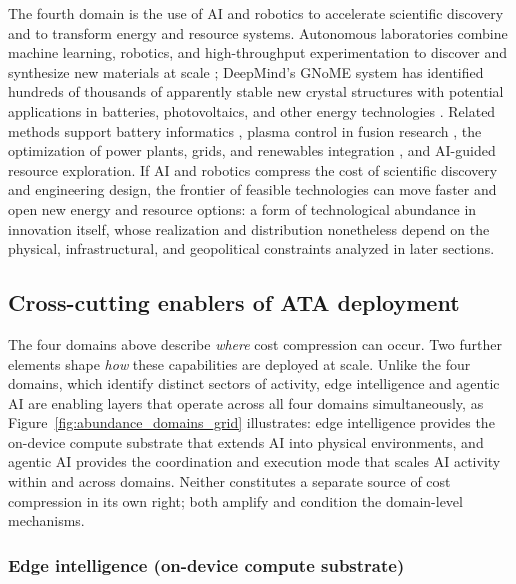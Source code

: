 \documentclass[11pt]{article}
\begin{document}
The fourth domain is the use of AI and robotics to accelerate scientific discovery and to transform energy and resource systems. Autonomous laboratories combine machine learning, robotics, and high-throughput experimentation to discover and synthesize new materials at scale \citep{Szymanski2023ALab}; DeepMind's GNoME system has identified hundreds of thousands of apparently stable new crystal structures with potential applications in batteries, photovoltaics, and other energy technologies \citep{DeepMindGNoME2023}. Related methods support battery informatics \citep{Ling2022BatteryInformatics}, plasma control in fusion research \citep{Degrave2022TokamakRL}, the optimization of power plants, grids, and renewables integration \citep{Entezari2023EnergyReview, IEA2023AI}, and AI-guided resource exploration. If AI and robotics compress the cost of scientific discovery and engineering design, the frontier of feasible technologies can move faster and open new energy and resource options: a form of technological abundance in innovation itself, whose realization and distribution nonetheless depend on the physical, infrastructural, and geopolitical constraints analyzed in later sections.

\subsection{Cross-cutting enablers of ATA deployment}
\label{subsec:enablers}

The four domains above describe \emph{where} cost compression can occur. Two further elements shape \emph{how} these capabilities are deployed at scale. Unlike the four domains, which identify distinct sectors of activity, edge intelligence and agentic AI are enabling layers that operate across all four domains simultaneously, as Figure~\ref{fig:abundance_domains_grid} illustrates: edge intelligence provides the on-device compute substrate that extends AI into physical environments, and agentic AI provides the coordination and execution mode that scales AI activity within and across domains. Neither constitutes a separate source of cost compression in its own right; both amplify and condition the domain-level mechanisms.

\subsubsection{Edge intelligence (on-device compute substrate)}\label{subsec:edge}
\end{document}
